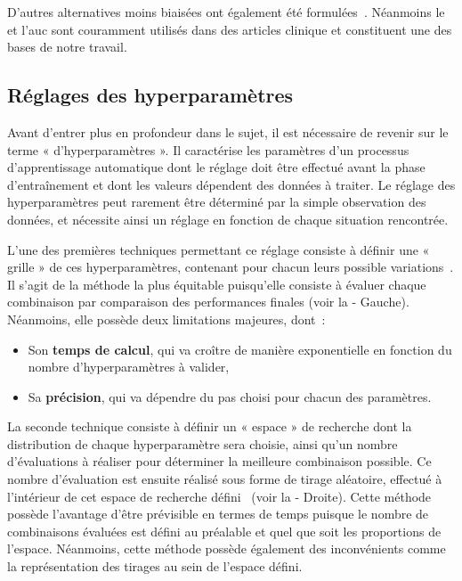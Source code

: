 D'autres alternatives moins biaisées ont également été formulées~\cite{Sokolova2006}. Néanmoins le \fscore{} et l'\gls{auc} sont couramment utilisés dans des articles clinique et constituent une des bases de notre travail.\par

\subsection{Réglages des hyperparamètres}
\label{subsec:hyperparameter}
Avant d’entrer plus en profondeur dans le sujet, il est nécessaire de revenir sur le terme « d’hyperparamètres ». Il caractérise les paramètres d'un processus d'apprentissage automatique dont le réglage doit être effectué avant la phase d'entraînement et dont les valeurs dépendent des données à traiter. Le réglage des hyperparamètres peut rarement être déterminé par la simple observation des données, et nécessite ainsi un réglage en fonction de chaque situation rencontrée.\par

L’une des premières techniques permettant ce réglage consiste à définir une « grille » de ces hyperparamètres, contenant pour chacun leurs possible variations~\cite{Liu2006}. Il s'agit de la méthode la plus équitable puisqu'elle consiste à évaluer chaque combinaison par comparaison des performances finales (voir la  - Gauche). Néanmoins, elle possède deux limitations majeures, dont~:
\begin{itemize}
    \item Son \textbf{temps de calcul}, qui va croître de manière exponentielle en fonction du nombre d'hyperparamètres à valider,
    \item Sa \textbf{précision}, qui va dépendre du pas choisi pour chacun des paramètres.
\end{itemize}\par

La seconde technique consiste à définir un « espace » de recherche dont la distribution de chaque hyperparamètre sera choisie, ainsi qu'un nombre d'évaluations à réaliser pour déterminer la meilleure combinaison possible. Ce nombre d'évaluation est ensuite réalisé sous forme de tirage aléatoire, effectué à l'intérieur de cet espace de recherche défini~\cite{bergstra2012} (voir la  - Droite). Cette méthode possède l'avantage d'être prévisible en termes de temps puisque le nombre de combinaisons évaluées est défini au préalable et quel que soit les proportions de l'espace. Néanmoins, cette méthode possède également des inconvénients comme la représentation des tirages au sein de l'espace défini.


